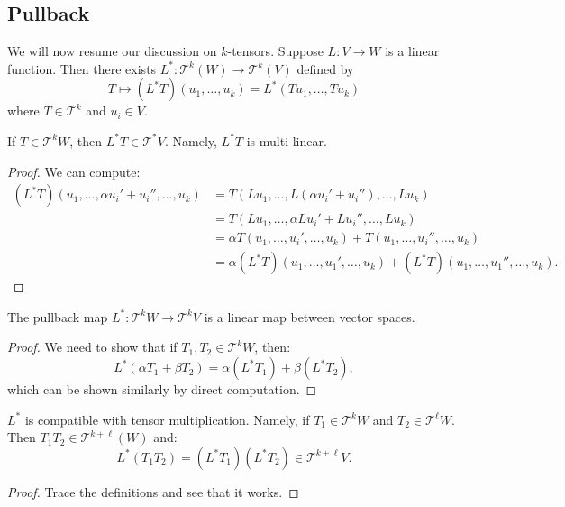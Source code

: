 \documentclass{article}
\numberwithin{equation}{section}
\begin{document}
\subsection{Pullback}
We will now resume our discussion on $k$-tensors. Suppose $L:V\rightarrow W$ is a linear function. Then there exists $L^*: \mathcal{T}^k(W) \rightarrow \mathcal{T}^k(V)$ defined by
\begin{equation}
    T \mapsto  (L^*T)(u_1,\dots,u_k) = L^*(Tu_1,\dots,Tu_k)
\end{equation}
where $T\in \mathcal{T}^k$ and $u_i \in V$.
\begin{lemma}
    If $T\in \mathcal{T}^k W$, then $L^*T \in \mathcal{T}^* V.$ Namely, $L^*T$ is multi-linear.
\end{lemma}
\begin{proof}
    We can compute:
    \begin{align}
        (L^*T)(u_1,\dots,\alpha u_i' + u_i'', \dots, u_k) &= T(Lu_1, \dots, L(\alpha u_i' + u_i''), \dots, Lu_k) \\ 
        &= T(Lu_1, \dots, \alpha Lu_i' + Lu_i'', \dots, Lu_k) \\
        &= \alpha T(u_1, \dots, u_i', \dots, u_k) + T(u_1, \dots, u_i'', \dots, u_k) \\
        &= \alpha(L^*T)(u_1,\dots,u_1',\dots,u_k) + (L^*T)(u_1,\dots,u_1'',\dots,u_k).
    \end{align}
\end{proof}
\begin{lemma}
    The pullback map $L^*: \mathcal{T}^k W \rightarrow \mathcal{T}^k V$ is a linear map between vector spaces.
\end{lemma}
\begin{proof}
    We need to show that if $T_1,T_2 \in \mathcal{T}^k W$, then:
    \begin{equation}
        L^*(\alpha T_1 + \beta T_2) = \alpha (L^*T_1) + \beta (L^*T_2),
    \end{equation}
    which can be shown similarly by direct computation.
\end{proof}
\begin{lemma}
    $L^*$ is compatible with tensor multiplication. Namely, if $T_1 \in \mathcal{T}^kW$ and $T_2\in \mathcal{T}^\ell W$. Then $T_1T_2 \in \mathcal{T}^{k+\ell}(W)$ and:
    \begin{equation}
        L^*(T_1T_2) = (L^*T_1)(L^*T_2) \in \mathcal{T}^{k+\ell}V.
    \end{equation}
\end{lemma}
\begin{proof}
    Trace the definitions and see that it works.
\end{proof}
\end{document}
